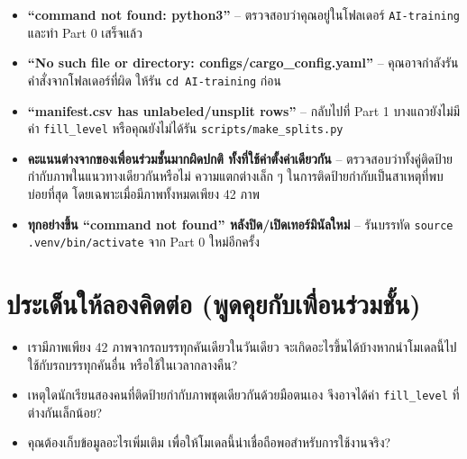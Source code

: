 \documentclass[11pt]{article}
\begin{document}
\begin{warnbox}
\begin{itemize}
  \item \textbf{``command not found: python3''} -- ตรวจสอบว่าคุณอยู่ในโฟลเดอร์ \texttt{AI-training} และทำ Part 0 เสร็จแล้ว
  \item \textbf{``No such file or directory: configs/cargo\_config.yaml''} -- คุณอาจกำลังรันคำสั่งจากโฟลเดอร์ที่ผิด ให้รัน \texttt{cd AI-training} ก่อน
  \item \textbf{``manifest.csv has unlabeled/unsplit rows''} -- กลับไปที่ Part 1 บางแถวยังไม่มีค่า \texttt{fill\_level} หรือคุณยังไม่ได้รัน \texttt{scripts/make\_splits.py}
  \item \textbf{คะแนนต่างจากของเพื่อนร่วมชั้นมากผิดปกติ ทั้งที่ใช้ค่าตั้งค่าเดียวกัน} -- ตรวจสอบว่าทั้งคู่ติดป้ายกำกับภาพในแนวทางเดียวกันหรือไม่ ความแตกต่างเล็ก ๆ ในการติดป้ายกำกับเป็นสาเหตุที่พบบ่อยที่สุด โดยเฉพาะเมื่อมีภาพทั้งหมดเพียง 42 ภาพ
  \item \textbf{ทุกอย่างขึ้น ``command not found'' หลังปิด/เปิดเทอร์มินัลใหม่} -- รันบรรทัด \texttt{source .venv/bin/activate} จาก Part 0 ใหม่อีกครั้ง
\end{itemize}
\end{warnbox}

\section*{ประเด็นให้ลองคิดต่อ (พูดคุยกับเพื่อนร่วมชั้น)}
\begin{itemize}
  \item เรามีภาพเพียง 42 ภาพจากรถบรรทุกคันเดียวในวันเดียว จะเกิดอะไรขึ้นได้บ้างหากนำโมเดลนี้ไปใช้กับรถบรรทุกคันอื่น หรือใช้ในเวลากลางคืน?
  \item เหตุใดนักเรียนสองคนที่ติดป้ายกำกับภาพชุดเดียวกันด้วยมือตนเอง จึงอาจได้ค่า \texttt{fill\_level} ที่ต่างกันเล็กน้อย?
  \item คุณต้องเก็บข้อมูลอะไรเพิ่มเติม เพื่อให้โมเดลนี้น่าเชื่อถือพอสำหรับการใช้งานจริง?
\end{itemize}
\end{document}
